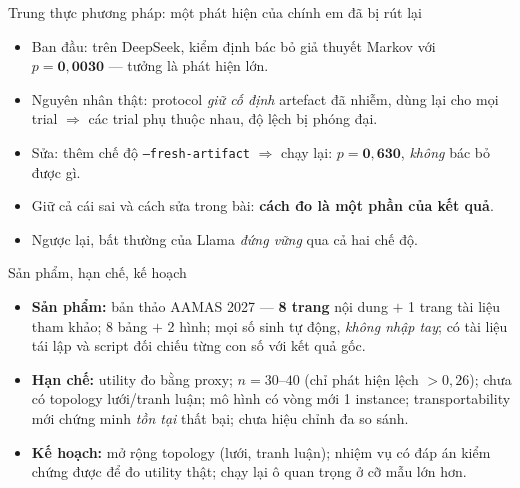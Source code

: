 \documentclass[aspectratio=169,11pt]{beamer}
\begin{document}
\begin{frame}{Trung thực phương pháp: một phát hiện của chính em đã bị rút lại}
  \begin{itemize}
    \item Ban đầu: trên DeepSeek, kiểm định bác bỏ giả thuyết Markov với
          $p=\mathbf{0{,}0030}$ --- tưởng là phát hiện lớn.
    \item Nguyên nhân thật: protocol \emph{giữ cố định} artefact đã nhiễm, dùng lại cho
          mọi trial $\Rightarrow$ các trial phụ thuộc nhau, độ lệch bị phóng đại.
    \item Sửa: thêm chế độ \texttt{--fresh-artifact} $\Rightarrow$ chạy lại:
          $p=\mathbf{0{,}630}$, \emph{không} bác bỏ được gì.
    \item Giữ cả cái sai và cách sửa trong bài: \textbf{cách đo là một phần của kết quả}.
    \item Ngược lại, bất thường của Llama \emph{đứng vững} qua cả hai chế độ.
  \end{itemize}
\end{frame}

\begin{frame}{Sản phẩm, hạn chế, kế hoạch}
  \begin{itemize}
    \item \textbf{Sản phẩm:} bản thảo AAMAS 2027 --- \textbf{8 trang} nội dung $+$ 1 trang
          tài liệu tham khảo; 8 bảng $+$ 2 hình; mọi số sinh tự động, \emph{không nhập tay};
          có tài liệu tái lập và script đối chiếu từng con số với kết quả gốc.
    \item \textbf{Hạn chế:} utility đo bằng proxy; $n=30$--$40$ (chỉ phát hiện lệch
          $>0{,}26$); chưa có topology lưới/tranh luận; mô hình có vòng mới 1 instance;
          transportability mới chứng minh \emph{tồn tại} thất bại; chưa hiệu chỉnh đa so sánh.
    \item \textbf{Kế hoạch:} mở rộng topology (lưới, tranh luận); nhiệm vụ có đáp án kiểm
          chứng được để đo utility thật; chạy lại ô quan trọng ở cỡ mẫu lớn hơn.
  \end{itemize}
\end{frame}
\end{document}
